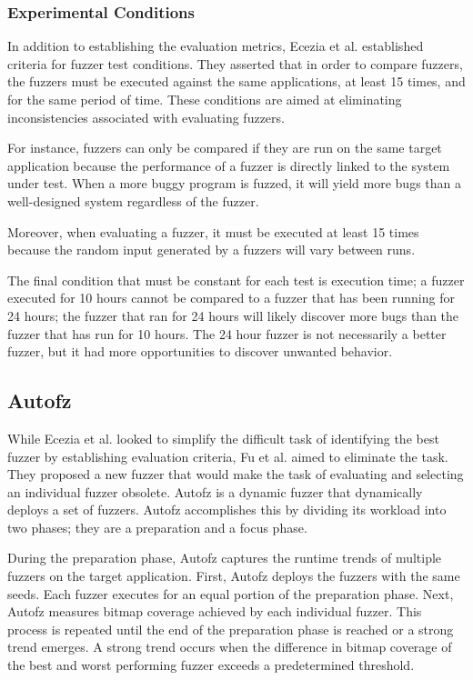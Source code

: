 \subsubsection{Experimental Conditions}
In addition to establishing the evaluation metrics, Ecezia et al. established  criteria for fuzzer 
test conditions. They asserted that in order to compare fuzzers, the fuzzers must be executed 
against the same applications, at least 15 times, and for the same period of time. These conditions 
are aimed at eliminating inconsistencies associated with evaluating fuzzers. 

For instance, fuzzers can only be compared if they are run on the same target application because 
the performance of a fuzzer is directly linked to the system under test. When a more buggy program 
is fuzzed, it will yield more bugs than a well-designed system regardless of the fuzzer. 

Moreover, when evaluating a fuzzer, it must be executed at least 15 times because the random input 
generated by a fuzzers will vary between runs.

The final condition that must be constant for each test is execution time; a fuzzer executed for 
10 hours cannot be compared to a fuzzer that has been running for 24 hours; the fuzzer that ran for 
24 hours will likely discover more bugs than the fuzzer that has run for 10 hours. The 24 hour fuzzer 
is not necessarily a better fuzzer, but it had more opportunities to discover unwanted behavior. 
\cite{eceiza_improving_2023}

\subsection{Autofz}
While Ecezia et al. looked to simplify the difficult task of identifying the best fuzzer by establishing 
evaluation criteria, Fu et al.\cite{fu_autofz_2023} aimed to eliminate the task. They proposed a new 
fuzzer that would make the task of evaluating and selecting an individual fuzzer obsolete. Autofz is a 
dynamic fuzzer that dynamically deploys a set of fuzzers. Autofz accomplishes this by dividing its 
workload into two phases; they are a preparation and a focus phase.

During the preparation phase, Autofz captures the runtime trends of multiple fuzzers on the target 
application. First, Autofz deploys the fuzzers with the same seeds. Each fuzzer executes for an equal 
portion of the preparation phase. Next, Autofz measures bitmap coverage achieved by each individual fuzzer. 
This process is repeated until the end of the preparation phase is reached or a strong trend emerges. A 
strong trend occurs when the difference in bitmap coverage of the best and worst performing fuzzer exceeds 
a predetermined threshold. 

